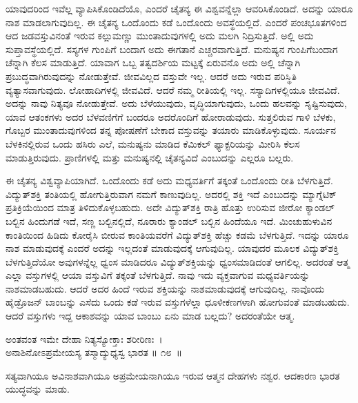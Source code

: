 ಯಾವುದರಿಂದ ಇವೆಲ್ಲ ವ್ಯಾಪಿಸಿಕೊಂಡಿದೆಯೊ, ಎಂದರೆ ಚೈತನ್ಯ ಈ ವಿಶ್ವವನ್ನೆಲ್ಲಾ ಆವರಿಸಿ\-ಕೊಂಡಿದೆ. ಅದನ್ನು ಯಾರೂ ನಾಶ ಮಾಡಲಾಗುವುದಿಲ್ಲ. ಈ ಚೈತನ್ಯ ಒಂದೊಂದು ಕಡೆ ಒಂದೊಂದು ಅವಸ್ಥೆಯಲ್ಲಿದೆ. ಎಂದರೆ ಪಂಚಭೂತಗಳಿಂದ ಆದ ಜಡವಸ್ತುವಿನಂತೆ ಇರುವ ಕಲ್ಲುಮಣ್ಣು ಮುಂತಾದುವುಗಳಲ್ಲಿ ಅದು ಮಲಗಿ ನಿದ್ರಿಸುತ್ತಿದೆ. ಅಲ್ಲಿ ಅದು ಸುಪ್ತಾವಸ್ಥೆಯಲ್ಲಿದೆ. ಸಸ್ಯಗಳ ಗುಂಪಿಗೆ ಬಂದಾಗ ಅದು ಈಗತಾನೆ ಎಚ್ಚರವಾಗುತ್ತಿದೆ. ಮನುಷ್ಯನ ಗುಂಪಿಗೆ\break ಬಂದಾಗ ಚೆನ್ನಾಗಿ ಕೆಲಸ ಮಾಡುತ್ತಿದೆ. ಯಾವಾಗ ಒಬ್ಬ ತತ್ವದರ್ಶಿಯ ಮಟ್ಟಕ್ಕೆ ಏರುವನೊ ಅದು ಅಲ್ಲಿ ಚೆನ್ನಾಗಿ ಪ್ರಬುದ್ಧವಾಗಿರುವುದನ್ನು ನೋಡುತ್ತೇವೆ. ಜೀವವಿಲ್ಲದ ವಸ್ತುವೇ ಇಲ್ಲ. ಆದರೆ ಅದು ಇರುವ ಪರಿಸ್ಥಿತಿ ವ್ಯತ್ಯಾಸವಾಗುವುದು. ಲೋಹಾದಿಗಳಲ್ಲಿ ಜೀವವಿದೆ. ಆದರೆ ನಮ್ಮ ರೀತಿಯಲ್ಲಿ ಇಲ್ಲ. ಸಸ್ಯಾದಿಗಳಲ್ಲಿಯೂ ಜೀವವಿದೆ. ಅದನ್ನು ನಾವು ನಿತ್ಯವೂ ನೋಡುತ್ತೇವೆ. ಅದು ಬೆಳೆಯುವುದು, ವೃದ್ಧಿಯಾಗುವುದು, ಒಂದು ಹಲವನ್ನು ಸೃಷ್ಟಿಸುವುದು, ಯಾವ ಆತಂಕಗಳು ಅದರ ಬೆಳವಣಿಗೆಗೆ ಬಂದರೂ ಅದರೊಂದಿಗೆ ಹೋರಾಡುವುದು. ಸುತ್ತಲಿರುವ ಗಾಳಿ ಬೆಳಕು, ಗೊಬ್ಬರ ಮುಂತಾದುವುಗಳಿಂದ ತನ್ನ ಪೋಷಣೆಗೆ ಬೇಕಾದ ವಸ್ತುವನ್ನು ತಯಾರು ಮಾಡಿಕೊಳ್ಳುವುದು. ಸೂರ್ಯನ ಬೆಳಕಿನಲ್ಲಿರುವ ಒಂದು ಹಸಿರು ಎಲೆ, ಮನುಷ್ಯನು ಮಾಡಿದ ಕೆಮಿಕಲ್ ಫ್ಯಾಕ್ಟರಿಯನ್ನು ಮೀರಿಸಿ ಕೆಲಸ ಮಾಡುತ್ತಿರುವುದು. ಪ್ರಾಣಿಗಳಲ್ಲಿ ಮತ್ತು ಮನುಷ್ಯನಲ್ಲಿ ಚೈತನ್ಯವಿದೆ ಎಂಬುದನ್ನು ಎಲ್ಲರೂ ಬಲ್ಲರು.

ಈ ಚೈತನ್ಯ ವಿಶ್ವವ್ಯಾಪಿಯಾಗಿದೆ. ಒಂದೊಂದು ಕಡೆ ಅದು ಮಧ್ಯವರ್ತಿಗೆ ತಕ್ಕಂತೆ ಒಂದೊಂದು ರೀತಿ ಬೆಳಗುತ್ತಿದೆ. ವಿದ್ಯುತ್​ಶಕ್ತಿ ತಂತಿಯಲ್ಲಿ ಹೋಗುತ್ತಿರುವಾಗ ನಮಗೆ ಕಾಣುವುದಿಲ್ಲ. ಅದರಲ್ಲಿ ಶಕ್ತಿ ಇದೆ ಎಂಬುದನ್ನು ಮ್ಯಾಗ್ನೆಟಿಕ್ ಪ್ರತಿಕ್ರಿಯೆಯಿಂದ ಮಾತ್ರ ತಿಳಿದುಕೊಳ್ಳಬಹುದು. ಅದೇ ವಿದ್ಯುತ್​ಶಕ್ತಿ ರಾತ್ರಿ ಹೊತ್ತು ಉರಿಸುವ ಜೀರೋ ಕ್ಯಾಂಡಲ್ ಬಲ್ಬಿನ ಹಿಂದುಗಡೆ ಇದೆ, ಸಣ್ಣ ಬಲ್ಬಿನಲ್ಲಿದೆ, ನೂರಾರು ಕ್ಯಾಂಡಲ್ ಬಲ್ಬಿನ ಹಿಂದೆಯೂ ಇದೆ. ಮಿಂಚುಹುಳುವಿನ ಕಾಂತಿಯಿಂದ ಹಿಡಿದು ಕೋರೈಸಿ ಬೀರುವ ಕಾಂತಿಯವರೆಗೆ ವಿದ್ಯುತ್​ಶಕ್ತಿ ಹೆಚ್ಚು ಕಡಮೆ ಬೆಳಗುತ್ತಿದೆ. ಇದನ್ನು ಯಾರೂ ನಾಶ ಮಾಡುವುದಕ್ಕೆ ಎಂದರೆ ಅದನ್ನು ಇಲ್ಲದಂತೆ ಮಾಡುವುದಕ್ಕೆ ಆಗುವುದಿಲ್ಲ. ಯಾವುದರ ಮೂಲಕ ವಿದ್ಯುತ್​ಶಕ್ತಿ ಬೆಳಗುತ್ತಿದೆಯೋ ಅವುಗಳನ್ನೆಲ್ಲ ಧ್ವಂಸ ಮಾಡಿದರೂ ವಿದ್ಯುತ್​ಶಕ್ತಿಯನ್ನು ಧ್ವಂಸಮಾಡಿದಂತೆ ಆಗಲಿಲ್ಲ. ಅದರಂತೆ ಆತ್ಮ ಎಲ್ಲಾ ವಸ್ತುಗಳಲ್ಲಿ ಆಯಾ ವಸ್ತುವಿಗೆ ತಕ್ಕಂತೆ ಬೆಳಗುತ್ತಿದೆ. ನಾವು ಇದು ವ್ಯಕ್ತವಾಗುವ ಮಧ್ಯವರ್ತಿಯನ್ನು ನಾಶಮಾಡಬಹುದು. ಆದರೆ ಅದರ ಹಿಂದೆ ಇರುವ ಶಕ್ತಿಯನ್ನು ನಾಶಮಾಡುವುದಕ್ಕೆ ಆಗುವುದಿಲ್ಲ. ನಾವೊಂದು ಹೈಡ್ರೊಜನ್ ಬಾಂಬನ್ನು ಎಸೆದು ಒಂದು ಕಡೆ ಇರುವ ವಸ್ತುಗಳೆಲ್ಲಾ ಧೂಳೀಕಣಗಳಾಗಿ ಹೋಗುವಂತೆ ಮಾಡಬಹುದು. ಆದರೆ ವಸ್ತುಗಳು ಇದ್ದ ಆಕಾಶವನ್ನು ಯಾವ ಬಾಂಬು ಏನು ಮಾಡ ಬಲ್ಲದು? ಅದರಂತೆಯೇ ಆತ್ಮ.

\begin{shloka}
ಅಂತವಂತ ಇಮೇ ದೇಹಾ ನಿತ್ಯಸ್ಯೋಕ್ತಾಃ ಶರೀರಿಣಃ~।\\ಅನಾಶಿನೋಽಪ್ರಮೇಯಸ್ಯ ತಸ್ಮಾದ್ಯುಧ್ಯಸ್ವ ಭಾರತ \hfill॥ ೧೮~॥
\end{shloka}

\begin{artha}
ಸತ್ಯವಾಗಿಯೂ ಅವಿನಾಶವಾಗಿಯೂ ಅಪ್ರಮೇಯನಾಗಿಯೂ ಇರುವ ಆತ್ಮನ ದೇಹಗಳು ನಶ್ವರ. ಆದಕಾರಣ ಭಾರತ ಯುದ್ಧವನ್ನು ಮಾಡು.
\end{artha}

